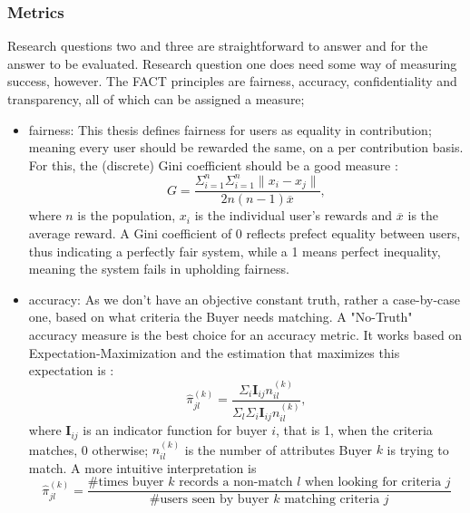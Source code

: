 \documentclass[english, 12pt, a4paper, sci, utf8, a-2b, online]{aaltothesis}
\theoremstyle{change}
\theoremstyle{theoremstyle}
\begin{document}
\subsubsection{Metrics}
Research questions two and three are straightforward to answer and for the answer to be evaluated. Research question one does need some way of measuring success, however. The FACT principles are fairness, accuracy, confidentiality and transparency, all of which can be assigned a measure;
\begin{itemize}
    \item fairness: This thesis defines fairness for users as equality in contribution; meaning every user should be rewarded the same, on a per contribution basis. For this, the (discrete) Gini coefficient should be a good measure \cite{RePEc:oxp:obooks:9780198281931}: %
    \begin{equation*}
     G = \frac{\Sigma^{n}_{i=1}\Sigma^{n}_{i=1}\| x_i-x_j \|}{2n(n-1)\overline{x}},   
    \end{equation*}
    where $n$ is the population, $x_i$ is the individual user's rewards and $\overline{x}$ is the average reward. A Gini coefficient of 0 reflects prefect equality between users, thus indicating a perfectly fair system, while a 1 means perfect inequality, meaning the system fails in upholding fairness.
    \item accuracy: As we don't have an objective constant truth, rather a case-by-case one, based on what criteria the Buyer needs matching. A "No-Truth" accuracy measure is the best choice for an accuracy metric. It works based on Expectation-Maximization and the estimation that maximizes this expectation is \cite{dawid1979maximum}: %
    \begin{equation*}
        \hat{\pi}^{(k)}_{jl} = \frac{\Sigma_i \mathbf{I}_{ij} n^{(k)}_{il}}{\Sigma_l \Sigma_i \mathbf{I}_{ij}n^{(k)}_{il}},   
    \end{equation*}
    where $\mathbf{I}_{ij}$ is an indicator function for buyer $i$, that is 1, when the criteria matches, 0 otherwise; $n^{(k)}_{il}$ is the number of attributes Buyer $k$ is trying to match.
    A more intuitive interpretation is 
    \begin{equation*}
        \hat{\pi}^{(k)}_{jl} = \frac{\text{\# times buyer $k$ records a non-match $l$ when looking for criteria $j$}}{\text{\# users seen by buyer $k$ matching criteria $j$}}

\end{equation*}
\end{itemize}
\end{document}
